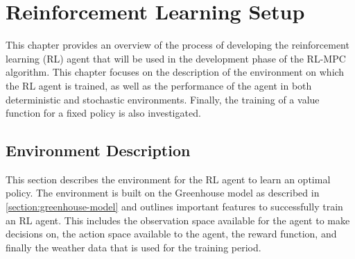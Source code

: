 \chapter{Reinforcement Learning Setup}
\label{chapter:RL}
This chapter provides an overview of the process of developing the reinforcement learning (RL) agent that will be used in the development phase of the RL-MPC algorithm. This chapter focuses on the description of the environment on which the RL agent is trained, as well as the performance of the agent in both deterministic and stochastic environments. Finally, the training of a value function for a fixed policy is also investigated. 

\section{Environment Description} \label{section:env-description}
This section describes the environment for the RL agent to learn an optimal policy. The environment is built on the Greenhouse model as described in \autoref{section:greenhouse-model} and outlines important features to successfully train an RL agent. This includes the observation space available for the agent to make decisions on, the action space available to the agent, the reward function, and finally the weather data that is used for the training period.


